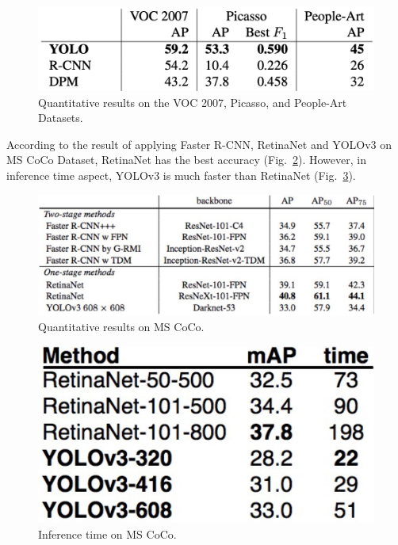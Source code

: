 \documentclass[letterpaper]{article} %
\begin{document}
\begin{figure}[ht]
\hspace{-12mm}
\centering
\includegraphics[scale = 0.4]{Figure/Results_1.png}
\caption{\footnotesize{Quantitative results on the VOC 2007, Picasso, and People-Art Datasets.\footnotemark}}
\label{fig:R_1}
\vspace{-2mm}
\end{figure}
\noindent According to the result of applying Faster R-CNN, RetinaNet and YOLOv3 on MS CoCo Dataset, RetinaNet has the best accuracy (Fig.~\ref{fig:R_2}). However, in inference time aspect, YOLOv3 is much faster than RetinaNet (Fig.~\ref{fig:R_3}).
\begin{figure}[ht]
\hspace{-10mm}
\centering
\includegraphics[scale = 0.2]{Figure/Result_2.jpg}
\caption{\footnotesize{Quantitative results on MS CoCo.}}
\label{fig:R_2}
\vspace{0mm}
\end{figure}
\begin{figure}[ht]
\hspace{-10mm}
\centering
\includegraphics[scale = 0.5]{Figure/Result_3.jpg}
\caption{\footnotesize{Inference time on MS CoCo.}}
\label{fig:R_3}
\vspace{-5mm}
\end{figure}
\end{document}
